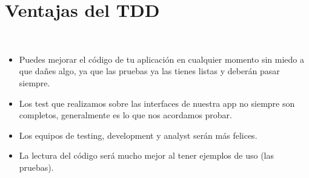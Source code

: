 \section{Ventajas del TDD} 

\textbf{}\\
\begin{flushleft}

\begin{itemize}
  \item Puedes mejorar el código de tu aplicación en cualquier momento sin miedo a que dañes algo, ya que las pruebas ya las tienes listas y deberán pasar siempre.

  \item Los test que realizamos sobre las interfaces de nuestra app no siempre son completos, generalmente es lo que nos acordamos probar.

  \item Los equipos de testing, development y analyst serán más felices.

  \item La lectura del código será mucho mejor al tener ejemplos de uso (las pruebas).


\end{itemize} 










\end{flushleft}
